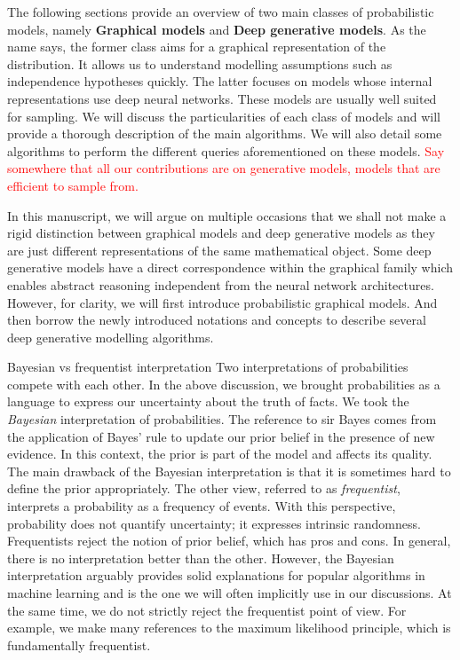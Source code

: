 The following sections provide an overview of two main classes of probabilistic models, namely \textbf{Graphical models} and \textbf{Deep generative models}. As the name says, the former class aims for a graphical representation of the distribution. It allows us to understand modelling assumptions such as independence hypotheses quickly. The latter focuses on models whose internal representations use deep neural networks. These models are usually well suited for sampling. We will discuss the particularities of each class of models and will provide a thorough description of the main algorithms. We will also detail some algorithms to perform the different queries aforementioned on these models. \textcolor{red}{Say somewhere that all our contributions are on generative models, models that are efficient to sample from.}

In this manuscript, we will argue on multiple occasions that we shall not make a rigid distinction between graphical models and deep generative models as they are just different representations of the same mathematical object. Some deep generative models have a direct correspondence within the graphical family which enables abstract reasoning independent from the neural network architectures. However, for clarity, we will first introduce probabilistic graphical models. And then borrow the newly introduced notations and concepts to describe several deep generative modelling algorithms.


\begin{side_note}{Bayesian vs frequentist interpretation}
  Two interpretations of probabilities compete with each other. In the above discussion, we brought probabilities as a language to express our uncertainty about the truth of facts. We took the \textit{Bayesian} interpretation of probabilities. The reference to sir Bayes comes from the application of Bayes' rule to update our prior belief in the presence of new evidence. In this context, the prior is part of the model and affects its quality. The main drawback of the Bayesian interpretation is that it is sometimes hard to define the prior appropriately. The other view, referred to as \textit{frequentist}, interprets a probability as a frequency of events. With this perspective, probability does not quantify uncertainty; it expresses intrinsic randomness. Frequentists reject the notion of prior belief, which has pros and cons. In general, there is no interpretation better than the other. However, the Bayesian interpretation arguably provides solid explanations for popular algorithms in machine learning and is the one we will often implicitly use in our discussions. At the same time, we do not strictly reject the frequentist point of view. For example, we make many references to the maximum likelihood principle, which is fundamentally frequentist.
\end{side_note}
%

